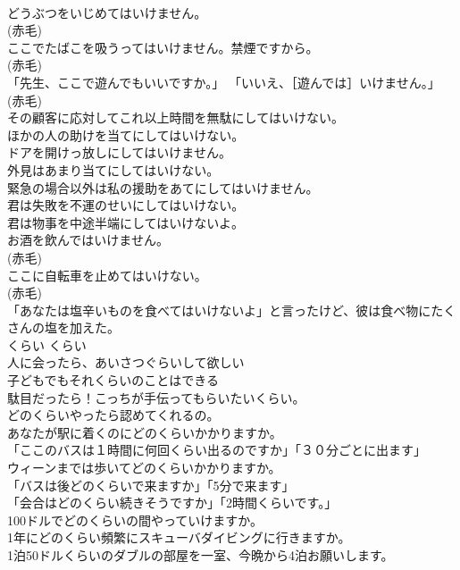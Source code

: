 \documentclass[8pt]{extreport}
\begin{document}
\begin{CJK}{UTF8}{min}
\\	どうぶつをいじめてはいけません。  
\\	(赤毛)
\\	ここでたばこを吸うってはいけません。禁煙ですから。  
\\	(赤毛)
\\	「先生、ここで遊んでもいいですか。」 「いいえ、［遊んでは］いけません。」  
\\	(赤毛)
\\	その顧客に応対してこれ以上時間を無駄にしてはいけない。  
\\	ほかの人の助けを当てにしてはいけない。  
\\	ドアを開けっ放しにしてはいけません。  
\\	外見はあまり当てにしてはいけない。  
\\	緊急の場合以外は私の援助をあてにしてはいけません。  
\\	君は失敗を不運のせいにしてはいけない。  
\\	君は物事を中途半端にしてはいけないよ。  
\\	お酒を飲んではいけません。  
\\	(赤毛)
\\	ここに自転車を止めてはいけない。  
\\	(赤毛)
\\	「あなたは塩辛いものを食べてはいけないよ」と言ったけど、彼は食べ物にたくさんの塩を加えた。   
\\	くらい	くらい	
\\	人に会ったら、あいさつぐらいして欲しい  
\\	子どもでもそれくらいのことはできる  
\\	駄目だったら！こっちが手伝ってもらいたいくらい。  
\\	どのくらいやったら認めてくれるの。  
\\	あなたが駅に着くのにどのくらいかかりますか。  
\\	「ここのバスは１時間に何回くらい出るのですか」「３０分ごとに出ます」   
\\	ウィーンまでは歩いてどのくらいかかりますか。  
\\	「バスは後どのくらいで来ますか」「5分で来ます」  
\\	「会合はどのくらい続きそうですか」「2時間くらいです。」  
\\	100ドルでどのくらいの間やっていけますか。  
\\	1年にどのくらい頻繁にスキューバダイビングに行きますか。  
\\	1泊50ドルくらいのダブルの部屋を一室、今晩から4泊お願いします。  

\end{CJK}
\end{document}
